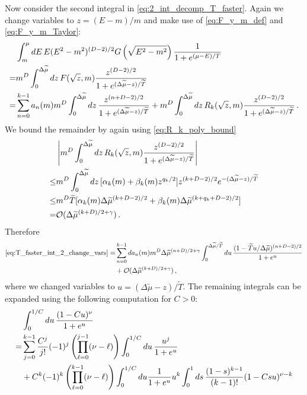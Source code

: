 \documentclass[sn-mathphys,Numbered]{sn-jnl}
\begin{document}
Now consider the second integral in \eqref{eq:2_int_decomp_T_faster}. Again we change variables to $z=(E-m)/m$ and make use of \eqref{eq:F_y_m_def} and \eqref{eq:F_y_m_Taylor}:
\begin{align}\label{eq:T_faster_int_2_change_vars} 
  &\int_m^{\mu} dE \,E(E^2-m^2)^{(D-2)/2} G\left(\sqrt{E^2-m^2}\right)\frac{1}{1+e^{(\mu-E)/T}} \\\notag
  =&m^{D}\int_0^{\Delta\widetilde{\mu}} dz \, F(\sqrt{z},m)\frac{z^{(D-2)/2}}{1+e^{(\Delta\widetilde{\mu}-z)/\widetilde{T}}}\notag\\
  =&\sum_{n=0}^{k-1} a_n(m)m^{D}\int_0^{\Delta\widetilde{\mu}} dz \,\frac{z^{(n+D-2)/2}}{1+e^{(\Delta\widetilde{\mu}-z)/\widetilde{T}}} +m^{D}\int_0^{\Delta\widetilde{\mu}} dz \,R_k(\sqrt{z},m)
\frac{z^{(D-2)/2}}{1+e^{(\Delta\widetilde{\mu}-z)/\widetilde{T}}}\notag\,.
\end{align}
We bound the remainder by again using \eqref{eq:R_k_poly_bound}
\begin{align}
 &\left|m^{D}\int_0^{\Delta\widetilde{\mu}} dz \,R_k(\sqrt{z},m)
\frac{z^{(D-2)/2}}{1+e^{(\Delta\widetilde{\mu}-z)/\widetilde{T}}}\right|\\
\leq&m^{D}\int_0^{\Delta\widetilde{\mu}} dz \,[\alpha_k(m)+\beta_k(m)z^{q_k/2}]z^{(k+D-2)/2}e^{-(\Delta\widetilde{\mu}-z)/\widetilde{T}}\notag\\
\leq &m^{D}\widetilde{T}[\alpha_k(m)\Delta\widetilde{\mu}^{(k+D-2)/2}+\beta_k(m)\Delta\widetilde{\mu}^{(k+q_k+D-2)/2}]\notag\\
=&\mathcal{O}(\Delta\widetilde{\mu}^{(k+D)/2+\gamma})\,.\notag
\end{align}
Therefore 
\begin{align}    \label{eq:T_faster_int_2_expanded1}
    \eqref{eq:T_faster_int_2_change_vars} =&\sum_{n=0}^{k-1} da_n(m)m^{D}\Delta\widetilde{\mu}^{(n+D)/2+\gamma}\int^{\Delta\widetilde{\mu}/\widetilde{T}}_{0} du \,\frac{(1-\widetilde{T}u/\Delta\widetilde{\mu})^{(n+D-2)/2}}{1+e^{u}} \\
    &+\mathcal{O}(\Delta\widetilde{\mu}^{(k+D)/2+\gamma})\notag\,,
\end{align}
where we changed variables to $u=(\Delta\widetilde{\mu}-z)/\widetilde{T}$. The remaining integrals can be expanded using the following computation for $C>0$: 
\begin{align}
&\int_0^{1/C} du \,\frac{(1-Cu)^\nu}{1+e^u}\\
=&\sum_{j=0}^{k-1}\frac{C^j}{j!}(-1)^j\left(\prod_{\ell=0}^{j-1}(\nu-\ell) \right)\int_0^{1/C} du \,\frac{u^j}{1+e^u}  \notag\\
&+ C^k (-1)^k\left(\prod_{\ell=0}^{k-1}(\nu-\ell)\right)\int_0^{1/C} du \frac{1}{1+e^u} u^k\int_0^1ds\,\frac{(1-s)^{k-1}}{(k-1)!} (1-Csu)^{\nu-k}\notag
\end{align}
\end{document}
